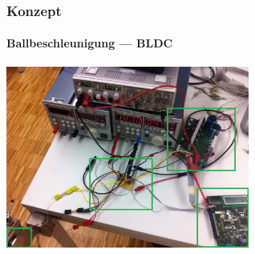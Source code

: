 \begin{frame}
    \frametitle{Konzept}
    \framesubtitle{Ballbeschleunigung --- BLDC}
    \begin{center}
        \includegraphics[width=0.6\textwidth]{../doc/fig/MessplatzAufbau.jpg}
    \end{center}
\end{frame}

